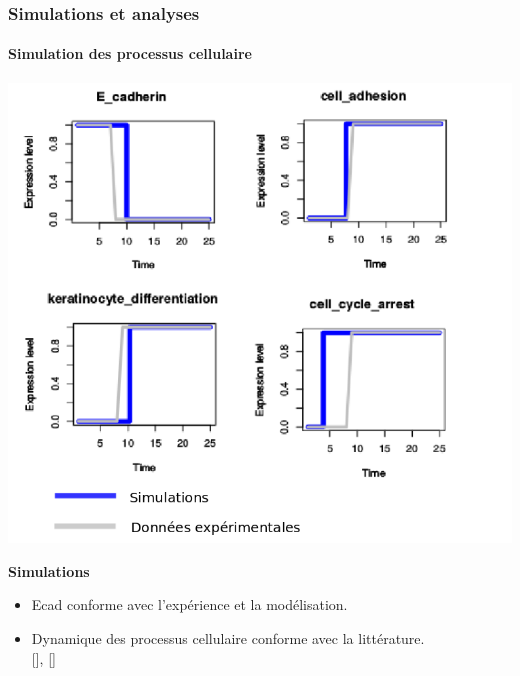 \begin{frame}[c]
  \frametitle{Simulations et analyses}
  \framesubtitle{Simulation des processus cellulaire}
 \begin{center}
  \includegraphics[scale=0.2]{figs/key_nodes2.png}
\end{center}

\textbf{Simulations}

\begin{itemize}
  \item Ecad conforme avec l'expérience et la modélisation.
 \item Dynamique des processus cellulaire conforme avec la littérature.\\
 {\tiny \color{darkgreen} [\citekolly]},
 {\tiny \color{darkgreen} [\citetu]}
  
\end{itemize}


\end{frame}




